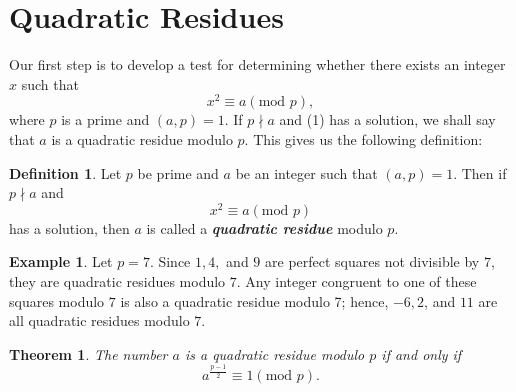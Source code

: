 \documentclass{article}
\newtheorem{theorem}{Theorem}[section]
\theoremstyle{definition}
\newtheorem{definition}{Definition}[section]
\theoremstyle{remark}
\theoremstyle{definition}
\newtheorem{example}{Example}[section]
\begin{document}
\section{Quadratic Residues}
    Our first step is to develop a test for determining whether there exists an integer $x$ such that 
        \begin{equation}
            x^2\equiv a(\text{mod }p),
        \end{equation}
    where $p$ is a prime and $(a,p)=1$. If $p\nmid a$ and (1) has a solution, we shall say that $a$ is a quadratic residue modulo $p$. This gives us the following definition:
    \begin{definition}\label{def:4.1}
        Let $p$ be prime and $a$ be an integer such that $(a,p)=1$. Then if $p\nmid a$ and 
            \begin{equation*}
                x^2\equiv a(\text{mod }p)
            \end{equation*}
        has a solution, then $a$ is called a \textbf{\textit{quadratic residue}} modulo $p$.
    \end{definition}
    \begin{example}\label{ex:4.1}
        Let $p=7$. Since $1,4,$ and $9$ are perfect squares not divisible by $7$, they are quadratic residues modulo $7$. Any integer congruent to one of these squares modulo $7$ is also a quadratic residue modulo 7; hence, $-6,2$, and $11$ are all quadratic residues modulo $7$.
    \end{example}
    \begin{theorem}\label{thm:4.1}
        The number $a$ is a quadratic residue modulo $p$ if and only if
            \begin{equation*}
                a^{\frac{p-1}{2}}\equiv 1(\text{mod }p).
            \end{equation*}
    \end{theorem}
\end{document}
